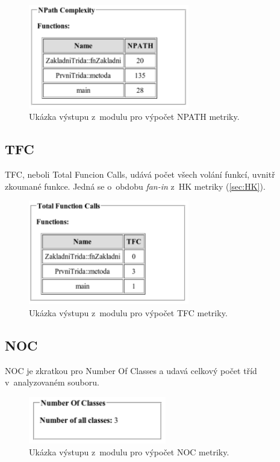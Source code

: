 \documentclass[11pt,twoside,a4paper]{book}
\begin{document}
\begin{figure}[H]
\begin{center}
\includegraphics[width=7cm]{figures/output_npath.pdf}
\caption{Ukázka výstupu z~modulu pro výpočet NPATH metriky.}
\label{fig:out_npath}
\end{center}
\end{figure}

\subsection{TFC}
TFC, neboli Total Funcion Calls, udává počet všech volání funkcí, uvnitř zkoumané funkce.
Jedná se o~obdobu \textit{fan-in} z~HK metriky (\ref{sec:HK}).

\begin{figure}[H]
\begin{center}
\includegraphics[width=7cm]{figures/output_tfc.pdf}
\caption{Ukázka výstupu z~modulu pro výpočet TFC metriky.}
\label{fig:out_tfc}
\end{center}
\end{figure}

\subsection{NOC}
NOC je zkratkou pro Number Of Classes a udavá celkový počet tříd v~analyzovaném souboru.

\begin{figure}[H]
\begin{center}
\includegraphics[width=6cm]{figures/output_noc.pdf}
\caption{Ukázka výstupu z~modulu pro výpočet NOC metriky.}
\label{fig:out_noc}
\end{center}
\end{figure}
\end{document}
